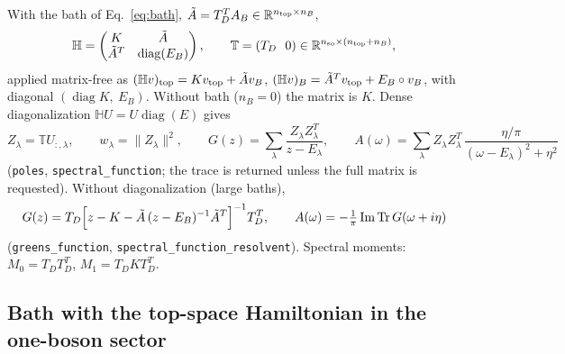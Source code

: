 \documentclass[11pt,a4paper]{article}
\newcommand{\bbH}{\mathbb{H}}
\newcommand{\bbT}{\mathbb{T}}
\newcommand{\code}[1]{\texttt{#1}}
\newcommand{\so}{\mathrm{so}}
\begin{document}
With the bath of Eq.~\eqref{eq:bath}, $\tilde A=T_D^{T}A_B\in\mathbb R^{n_{\rm top}\times n_B}$,
\begin{equation}
  \bbH=\begin{pmatrix}K&\tilde A\\ \tilde A^{T}&\operatorname{diag}(E_B)\end{pmatrix},\qquad
  \bbT=(T_D\ \ 0)\in\mathbb R^{n_{\so}\times(n_{\rm top}+n_B)},
  \label{eq:Hfull}
\end{equation}
applied matrix-free as
$(\bbH v)_{\rm top}=Kv_{\rm top}+\tilde Av_B$, $(\bbH v)_B=\tilde A^{T}v_{\rm top}+E_B\circ v_B$,
with diagonal $(\operatorname{diag}K,\ E_B)$.  Without bath ($n_B=0$) the
matrix is $K$.  Dense diagonalization $\bbH U=U\operatorname{diag}(E)$ gives
\begin{equation}
  Z_\lambda=\bbT U_{:,\lambda},\qquad w_\lambda=\|Z_\lambda\|^2,\qquad
  G(z)=\sum_\lambda\frac{Z_\lambda Z_\lambda^{T}}{z-E_\lambda},\qquad
  A(\omega)=\sum_\lambda Z_\lambda Z_\lambda^{T}\,\frac{\eta/\pi}{(\omega-E_\lambda)^2+\eta^2}
  \label{eq:spectral}
\end{equation}
(\code{poles}, \code{spectral\_function}; the trace is returned unless the
full matrix is requested).  Without diagonalization (large baths),
\begin{equation}
  G(z)=T_D\Bigl[z-K-\tilde A\,(z-E_B)^{-1}\tilde A^{T}\Bigr]^{-1}T_D^{T},\qquad
  A(\omega)=-\tfrac1\pi\operatorname{Im}\operatorname{Tr}G(\omega+i\eta)
  \label{eq:schur}
\end{equation}
(\code{greens\_function}, \code{spectral\_function\_resolvent}).  Spectral
moments: $M_0=T_DT_D^{T}$, $M_1=T_DKT_D^{T}$.

\subsection{Bath with the top-space Hamiltonian in the one-boson sector}
\label{sec:dressed-bath}
\end{document}
